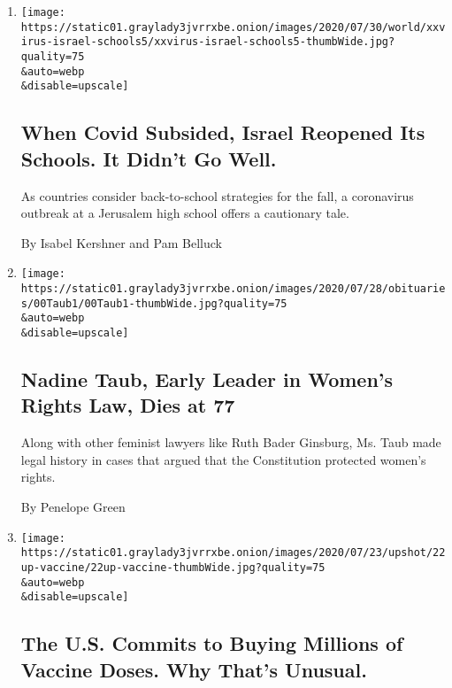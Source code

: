 \begin{enumerate}
\def\labelenumi{\arabic{enumi}.}
\item
  \href{/2020/08/04/world/middleeast/coronavirus-israel-schools-reopen.html}{}

  \texttt{[image: https://static01.graylady3jvrrxbe.onion/images/2020/07/30/world/xxvirus-israel-schools5/xxvirus-israel-schools5-thumbWide.jpg?quality=75\\\&auto=webp\\\&disable=upscale]}

  \hypertarget{when-covid-subsided-israel-reopened-its-schools-it-didnt-go-well}{%
  \subsection{When Covid Subsided, Israel Reopened Its Schools. It
  Didn't Go
  Well.}\label{when-covid-subsided-israel-reopened-its-schools-it-didnt-go-well}}

  As countries consider back-to-school strategies for the fall, a
  coronavirus outbreak at a Jerusalem high school offers a cautionary
  tale.

  By Isabel Kershner and Pam Belluck
\item
  \href{/2020/07/24/us/nadine-taub-feminist-lawyer-dead.html}{}

  \texttt{[image: https://static01.graylady3jvrrxbe.onion/images/2020/07/28/obituaries/00Taub1/00Taub1-thumbWide.jpg?quality=75\\\&auto=webp\\\&disable=upscale]}

  \hypertarget{nadine-taub-early-leader-in-womens-rights-law-dies-at-77}{%
  \subsection{Nadine Taub, Early Leader in Women's Rights Law, Dies at
  77}\label{nadine-taub-early-leader-in-womens-rights-law-dies-at-77}}

  Along with other feminist lawyers like Ruth Bader Ginsburg, Ms. Taub
  made legal history in cases that argued that the Constitution
  protected women's rights.

  By Penelope Green
\item
  \href{/2020/07/22/upshot/vaccine-coronavirus-government-purchase.html}{}

  \texttt{[image: https://static01.graylady3jvrrxbe.onion/images/2020/07/23/upshot/22up-vaccine/22up-vaccine-thumbWide.jpg?quality=75\\\&auto=webp\\\&disable=upscale]}

  \hypertarget{the-us-commits-to-buying-millions-of-vaccine-doses-why-thats-unusual}{%
  \subsection{The U.S. Commits to Buying Millions of Vaccine Doses. Why
  That's
  Unusual.}\label{the-us-commits-to-buying-millions-of-vaccine-doses-why-thats-unusual}}


\end{enumerate}
